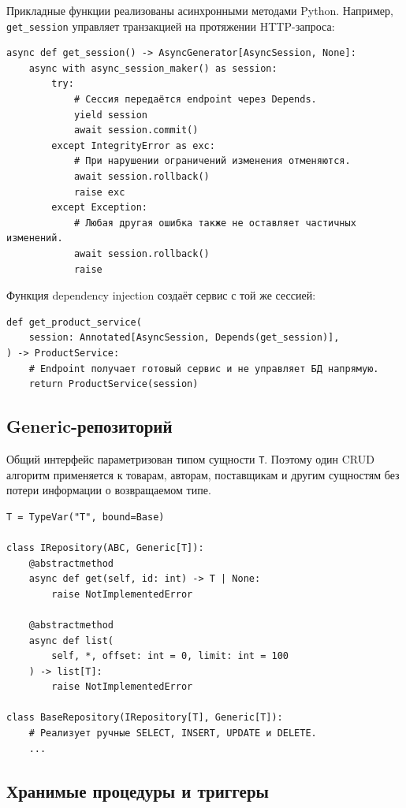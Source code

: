 \documentclass[14pt,a4paper]{extarticle}
\begin{document}
Прикладные функции реализованы асинхронными методами Python. Например,
\texttt{get\_session} управляет транзакцией на протяжении HTTP-запроса:

\begin{verbatim}
async def get_session() -> AsyncGenerator[AsyncSession, None]:
    async with async_session_maker() as session:
        try:
            # Сессия передаётся endpoint через Depends.
            yield session
            await session.commit()
        except IntegrityError as exc:
            # При нарушении ограничений изменения отменяются.
            await session.rollback()
            raise exc
        except Exception:
            # Любая другая ошибка также не оставляет частичных изменений.
            await session.rollback()
            raise
\end{verbatim}

Функция dependency injection создаёт сервис с той же сессией:

\begin{verbatim}
def get_product_service(
    session: Annotated[AsyncSession, Depends(get_session)],
) -> ProductService:
    # Endpoint получает готовый сервис и не управляет БД напрямую.
    return ProductService(session)
\end{verbatim}

\subsection{Generic-репозиторий}

Общий интерфейс параметризован типом сущности \texttt{T}. Поэтому один CRUD
алгоритм применяется к товарам, авторам, поставщикам и другим сущностям без
потери информации о возвращаемом типе.

\begin{verbatim}
T = TypeVar("T", bound=Base)

class IRepository(ABC, Generic[T]):
    @abstractmethod
    async def get(self, id: int) -> T | None:
        raise NotImplementedError

    @abstractmethod
    async def list(
        self, *, offset: int = 0, limit: int = 100
    ) -> list[T]:
        raise NotImplementedError

class BaseRepository(IRepository[T], Generic[T]):
    # Реализует ручные SELECT, INSERT, UPDATE и DELETE.
    ...
\end{verbatim}

\subsection{Хранимые процедуры и триггеры}
\end{document}
